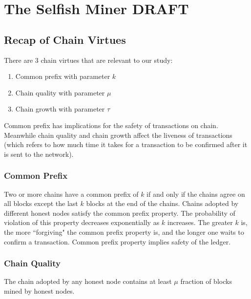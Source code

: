 \chapter{The Selfish Miner \small{\textsf{DRAFT}}}

\section{Recap of Chain Virtues}
There are 3 chain virtues that are relevant to our study:

\begin{enumerate}
    \item Common prefix with parameter $k$
    \item Chain quality with parameter $\mu$
    \item Chain growth with parameter $\tau$
\end{enumerate}


Common prefix has implications for the safety of transactions on chain. Meanwhile chain quality and chain growth affect the liveness of transactions (which refers to how much time it takes for a transaction to be confirmed after it is sent to the network).

\subsection{Common Prefix}

Two or more chains have a common prefix of $k$ if and only if the chains agree on all blocks except the last $k$ blocks at the end of the chains.
Chains adopted by different honest nodes satisfy the common prefix property.
The probability of violation of this property decreases exponentially as $k$ increases. The greater $k$ is, the more ``forgiving" the common prefix property is, and the longer one waits to confirm a transaction.
Common prefix property implies safety of the ledger.

\subsection{Chain Quality}
The chain adopted by any honest node contains at least $\mu$ fraction of blocks mined by honest nodes.

